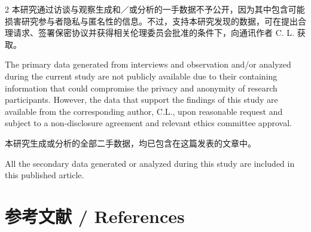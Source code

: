 \documentclass[10pt,a4paper]{article}
\begin{document}
\begin{paracol}{2}
本研究通过访谈与观察生成和／或分析的一手数据不予公开，因为其中包含可能损害研究参与者隐私与匿名性的信息。不过，支持本研究发现的数据，可在提出合理请求、签署保密协议并获得相关伦理委员会批准的条件下，向通讯作者 C. L. 获取。\par
\switchcolumn
The primary data generated from interviews and observation and/or analyzed during the current study are not publicly available due to their containing information that could compromise the privacy and anonymity of research participants. However, the data that support the findings of this study are available from the corresponding author, C.L., upon reasonable request and subject to a non-disclosure agreement and relevant ethics committee approval.\par
\switchcolumn*
本研究生成或分析的全部二手数据，均已包含在这篇发表的文章中。\par
\switchcolumn
All the secondary data generated or analyzed during this study are included in this published article.\par
\switchcolumn*
\end{paracol}
\section*{参考文献 / References}
\end{document}
